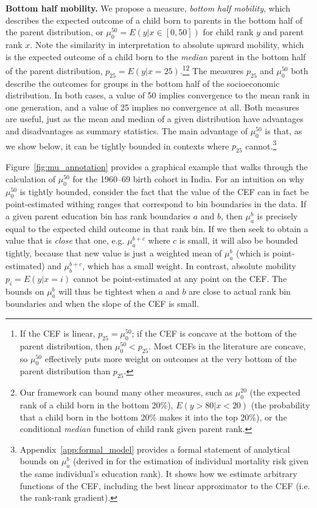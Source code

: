 \documentclass[12pt,letterpaper]{article}
\numberwithin{equation}{section}
\begin{document}
\textbf{Bottom half mobility.} We propose a measure, \textit{bottom half mobility}, which describes the expected outcome of a child born to parents in the bottom half of the parent distribution, or $\mu_0^{50} = E(y|x \in [0, 50])$ for child rank $y$ and parent rank $x$. Note the similarity in interpretation to absolute upward mobility, which is the expected outcome of a child born to the \textit{median} parent in the bottom half of the parent distribution, $p_{25}=E(y|x = 25)$.\footnote{If the CEF is linear, $p_{25}=\mu_0^{50}$; if the CEF is concave at the bottom of the parent distribution, then $\mu_0^{50} < p_{25}$. Most CEFs in the literature are concave, so $\mu_0^{50}$ effectively puts more weight on outcomes at the very bottom of the parent distribution than $p_{25}$.}\superscript{,}\footnote{Our framework can bound many other measures, such as $\mu_0^{20}$ (the expected rank of a child born in the bottom 20\%), $E(y > 80 | x < 20)$ (the probability that a child born in the bottom 20\% makes it into the top 20\%), or the conditional \textit{median} function of child rank given parent rank.} The measures $p_{25}$ and $\mu_0^{50}$ both describe the outcomes for groups in the bottom half of the socioeconomic distribution. In both cases, a value of 50 implies convergence to the mean rank in one generation, and a value of 25 implies no convergence at all. Both measures are useful, just as the mean and median of a given distribution have advantages and disadvantages as summary statistics. The main advantage of $\mu_0^{50}$ is that, as we show below, it can be tightly bounded in contexts where $p_{25}$ cannot.\footnote{Appendix~\ref{app:formal_model} provides a formal statement of analytical bounds on $\mu_a^b$ (derived in  for the estimation of individual mortality risk given the same individual's education rank). It shows how we estimate arbitrary functions of the CEF, including the best linear approximator to the CEF (i.e. the rank-rank gradient).} 

Figure~\ref{fig:mu_annotation} provides a graphical example that walks through the calculation of $\mu_0^{50}$ for the 1960--69 birth cohort in India. For an intuition on why $\mu_0^{50}$ is tightly bounded, consider the fact that the value of the CEF can in fact be point-estimated withing ranges that correspond to bin boundaries in the data. If a given parent education bin has rank boundaries $a$ and $b$, then $\mu_a^b$ is precisely equal to the expected child outcome in that rank bin. If we then seek to obtain a value that is \textit{close} that one, e.g. $\mu_a^{b+c}$ where $c$ is small, it will also be bounded tightly, because that new value is just a weighted mean of $\mu_a^b$ (which is point-estimated) and $\mu_b^{b+c}$, which has a small weight. In contrast, absolute mobility $p_i = E(y|x=i)$ cannot be point-estimated at any point on the CEF. The bounds on $\mu_a^b$ will thus be tightest when $a$ and $b$ are close to actual rank bin boundaries and when the slope of the CEF is small.
\end{document}
